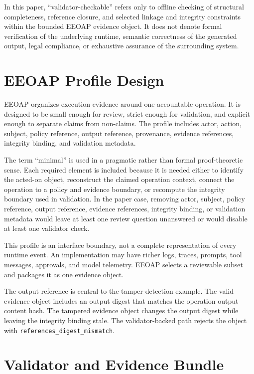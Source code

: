 \documentclass[11pt]{article}
\begin{document}
In this paper, ``validator-checkable'' refers only to offline checking of
structural completeness, reference closure, and selected linkage and integrity
constraints within the bounded EEOAP evidence object. It does not denote
formal verification of the underlying runtime, semantic correctness of the
generated output, legal compliance, or exhaustive assurance of the surrounding
system.

\section{EEOAP Profile Design}

EEOAP organizes execution evidence around one accountable operation. It is
designed to be small enough for review, strict enough for validation, and
explicit enough to separate claims from non-claims. The profile includes
actor, action, subject, policy reference, output reference, provenance,
evidence references, integrity binding, and validation metadata.

The term ``minimal'' is used in a pragmatic rather than formal proof-theoretic
sense. Each required element is included because it is needed either to
identify the acted-on object, reconstruct the claimed operation context,
connect the operation to a policy and evidence boundary, or recompute the
integrity boundary used in validation. In the paper case, removing actor,
subject, policy reference, output reference, evidence references, integrity
binding, or validation metadata would leave at least one review question
unanswered or would disable at least one validator check.

This profile is an interface boundary, not a complete representation of every
runtime event. An implementation may have richer logs, traces, prompts, tool
messages, approvals, and model telemetry. EEOAP selects a reviewable subset
and packages it as one evidence object.

The output reference is central to the tamper-detection example. The valid
evidence object includes an output digest that matches the operation output
content hash. The tampered evidence object changes the output digest while
leaving the integrity binding stale. The validator-backed path rejects the
object with \texttt{references\_digest\_mismatch}.

\section{Validator and Evidence Bundle}
\end{document}
